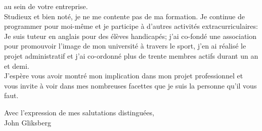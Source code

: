 \documentclass[12pt,a4paper]{letter}
\begin{document}
au sein de votre entreprise.
\\[.2in]
Studieux et bien noté, je ne me contente pas de ma formation.
Je continue de programmer pour moi-même et je participe à
d'autres activités extracurriculaires: \newline
Je suis tuteur en anglais pour des élèves handicapés;
j'ai co-fondé une association pour promouvoir l'image de
mon université à travers le sport, j'en ai réalisé le projet
administratif et j'ai co-ordonné plus de trente membres actifs
durant un an et demi.
\\[.2in]
J'espère vous avoir montré mon implication dans mon projet professionnel
et vous invite à voir dans mes nombreuses facettes que je suis
la personne qu'il vous faut.
\\[.1in]
\begin{flushright}
Avec l'expression de mes salutations distinguées,
\\[.2in]
John Gliksberg
\end{flushright}
\end{document}
